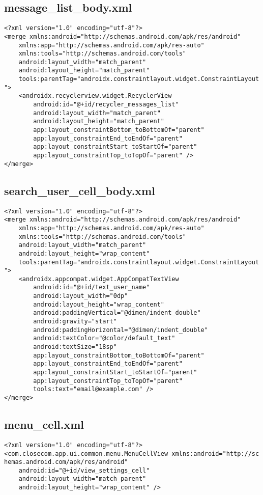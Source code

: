 \documentclass[listing]{espd}
\begin{document}
\subsection{message\_list\_body.xml}
\begin{verbatim}
<?xml version="1.0" encoding="utf-8"?>
<merge xmlns:android="http://schemas.android.com/apk/res/android"
    xmlns:app="http://schemas.android.com/apk/res-auto"
    xmlns:tools="http://schemas.android.com/tools"
    android:layout_width="match_parent"
    android:layout_height="match_parent"
    tools:parentTag="androidx.constraintlayout.widget.ConstraintLayout
">
    <androidx.recyclerview.widget.RecyclerView
        android:id="@+id/recycler_messages_list"
        android:layout_width="match_parent"
        android:layout_height="match_parent"
        app:layout_constraintBottom_toBottomOf="parent"
        app:layout_constraintEnd_toEndOf="parent"
        app:layout_constraintStart_toStartOf="parent"
        app:layout_constraintTop_toTopOf="parent" />
</merge>
\end{verbatim}

\subsection{search\_user\_cell\_body.xml}
\begin{verbatim}
<?xml version="1.0" encoding="utf-8"?>
<merge xmlns:android="http://schemas.android.com/apk/res/android"
    xmlns:app="http://schemas.android.com/apk/res-auto"
    xmlns:tools="http://schemas.android.com/tools"
    android:layout_width="match_parent"
    android:layout_height="wrap_content"
    tools:parentTag="androidx.constraintlayout.widget.ConstraintLayout
">
    <androidx.appcompat.widget.AppCompatTextView
        android:id="@+id/text_user_name"
        android:layout_width="0dp"
        android:layout_height="wrap_content"
        android:paddingVertical="@dimen/indent_double"
        android:gravity="start"
        android:paddingHorizontal="@dimen/indent_double"
        android:textColor="@color/default_text"
        android:textSize="18sp"
        app:layout_constraintBottom_toBottomOf="parent"
        app:layout_constraintEnd_toEndOf="parent"
        app:layout_constraintStart_toStartOf="parent"
        app:layout_constraintTop_toTopOf="parent"
        tools:text="email@example.com" />
</merge>
\end{verbatim}

\subsection{menu\_cell.xml}
\begin{verbatim}
<?xml version="1.0" encoding="utf-8"?>
<com.closecom.app.ui.common.menu.MenuCellView xmlns:android="http://sc
hemas.android.com/apk/res/android"
    android:id="@+id/view_settings_cell"
    android:layout_width="match_parent"
    android:layout_height="wrap_content" />
\end{verbatim}
\end{document}
